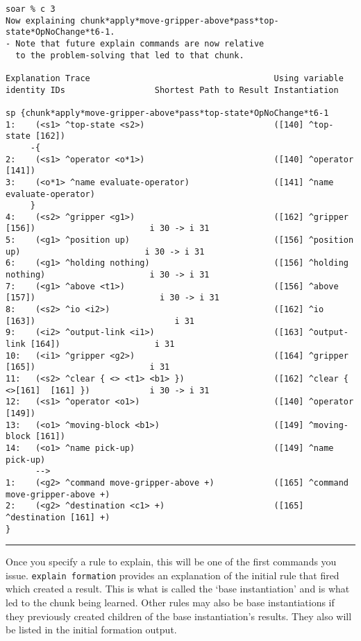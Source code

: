 {\tiny
\begin{verbatim}
soar % c 3
Now explaining chunk*apply*move-gripper-above*pass*top-state*OpNoChange*t6-1.
- Note that future explain commands are now relative
  to the problem-solving that led to that chunk.

Explanation Trace                                     Using variable identity IDs                  Shortest Path to Result Instantiation

sp {chunk*apply*move-gripper-above*pass*top-state*OpNoChange*t6-1
1:    (<s1> ^top-state <s2>)                          ([140] ^top-state [162])
     -{
2:    (<s1> ^operator <o*1>)                          ([140] ^operator [141])
3:    (<o*1> ^name evaluate-operator)                 ([141] ^name evaluate-operator)
     }
4:    (<s2> ^gripper <g1>)                            ([162] ^gripper [156])                       i 30 -> i 31
5:    (<g1> ^position up)                             ([156] ^position up)                         i 30 -> i 31
6:    (<g1> ^holding nothing)                         ([156] ^holding nothing)                     i 30 -> i 31
7:    (<g1> ^above <t1>)                              ([156] ^above [157])                         i 30 -> i 31
8:    (<s2> ^io <i2>)                                 ([162] ^io [163])                            i 31
9:    (<i2> ^output-link <i1>)                        ([163] ^output-link [164])                   i 31
10:   (<i1> ^gripper <g2>)                            ([164] ^gripper [165])                       i 31
11:   (<s2> ^clear { <> <t1> <b1> })                  ([162] ^clear { <>[161]  [161] })            i 30 -> i 31
12:   (<s1> ^operator <o1>)                           ([140] ^operator [149])
13:   (<o1> ^moving-block <b1>)                       ([149] ^moving-block [161])
14:   (<o1> ^name pick-up)                            ([149] ^name pick-up)
      -->
1:    (<g2> ^command move-gripper-above +)            ([165] ^command move-gripper-above +)
2:    (<g2> ^destination <c1> +)                      ([165] ^destination [161] +)
}
\end{verbatim}
}

\rule{\textwidth}{1pt}

\textbf{}

Once you specify a rule to explain, this will be one of the first commands you issue.  \texttt{explain\ formation} provides an explanation of the initial rule that fired which created a result. This is what is called the `base
instantiation' and is what led to the chunk being learned. Other rules may also be base instantiations if they previously created children of the base instantiation's results. They also will be listed in the initial formation output.


